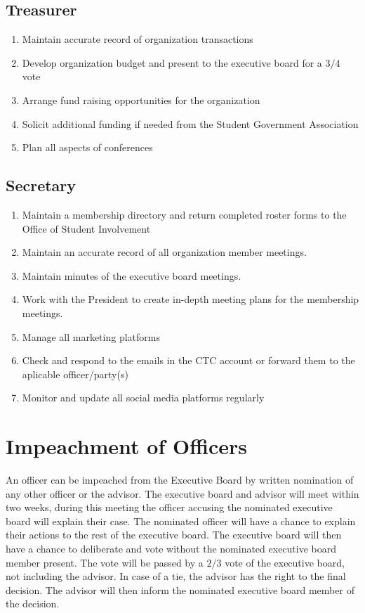 \documentclass{article}
\newcommand{\article}[1]{\section{#1} \label{#1}}
\newcommand{\asection}[1]{\subsection{#1} \label{#1}}
\begin{document}
\asection{Treasurer}
\begin{enumerate}
\item Maintain accurate record of organization transactions
\item Develop organization budget and present to the executive board for a $3/4$ vote
\item Arrange fund raising opportunities for the organization
\item Solicit additional funding if needed from the Student Government Association
\item Plan all aspects of conferences
\end{enumerate}

\asection {Secretary}
\begin{enumerate}
\item Maintain a membership directory and return completed roster forms to the Office of Student Involvement
\item Maintain an accurate record of all organization member meetings.
\item Maintain minutes of the executive board meetings.
\item Work with the President to create in-depth meeting plans for the membership meetings.
\item Manage all marketing platforms
\item Check and respond to the emails in the CTC account or forward them to the aplicable officer/party(s)
\item Monitor and update all social media platforms regularly
\end{enumerate}

\article{Impeachment of Officers}
An officer can be impeached from the Executive Board by written nomination of any other officer or the advisor. 
The executive board and advisor will meet within two weeks, during this meeting the officer accusing the nominated executive board will explain their case. 
The nominated officer will have a chance to explain their actions to the rest of the executive board. 
The executive board will then have a chance to deliberate and vote without the nominated executive board member present. 
The vote will be passed by a $2/3$ vote of the executive board, not including the advisor. 
In case of a tie, the advisor has the right to the final decision. 
The advisor will then inform the nominated executive board member of the decision.
\end{document}

